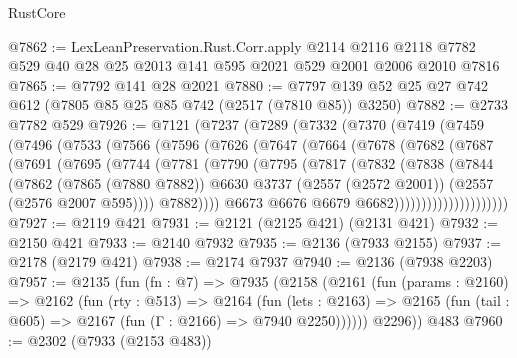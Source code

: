 \begin{lexlean}{RustCore}
\begin{coremodule}
@7862 := LexLeanPreservation.Rust.Corr.apply
    @2114
    @2116
    @2118
    @7782
    @529
    @40
    @28
    @25
    @2013
    @141
    @595
    @2021
    @529
    @2001
    @2006
    @2010
    @7816
@7865 := @7792 @141 @28 @2021
@7880 := @7797 @139 @52 @25 @27 @742 @612 (@7805 @85 @25 @85 @742 (@2517 (@7810 @85)) @3250)
@7882 := @2733 @7782 @529
@7926 := @7121
    (@7237
      (@7289
        (@7332
          (@7370
            (@7419
              (@7459
                (@7496
                  (@7533
                    (@7566
                      (@7596
                        (@7626
                          (@7647
                            (@7664
                              (@7678
                                (@7682
                                  (@7687
                                    (@7691
                                      (@7695
                                        (@7744
                                          (@7781
                                            (@7790
                                              (@7795
                                                (@7817
                                                  (@7832
                                                    (@7838
                                                      (@7844
                                                        (@7862
                                                          (@7865 (@7880 @7882))
                                                          @6630
                                                          @3737
                                                          (@2557 (@2572 @2001))
                                                          (@2557 (@2576 @2007 @595))))
                                                      @7882))))
                                              @6673
                                              @6676
                                              @6679
                                              @6682)))))))))))))))))))))
@7927 := @2119 @421
@7931 := @2121 (@2125 @421) (@2131 @421)
@7932 := @2150 @421
@7933 := @2140 @7932
@7935 := @2136 (@7933 @2155)
@7937 := @2178 (@2179 @421)
@7938 := @2174 @7937
@7940 := @2136 (@7938 @2203)
@7957 := @2135
    (fun (fn : @7) =>
    @7935
      (@2158
        (@2161
          (fun (params : @2160) =>
          @2162
            (fun (rty : @513) =>
            @2164
              (fun (lets : @2163) =>
              @2165 (fun (tail : @605) => @2167 (fun (Γ : @2166) => @7940 @2250))))))
        @2296))
    @483
@7960 := @2302 (@7933 (@2153 @483))

\end{coremodule}
\end{lexlean}
